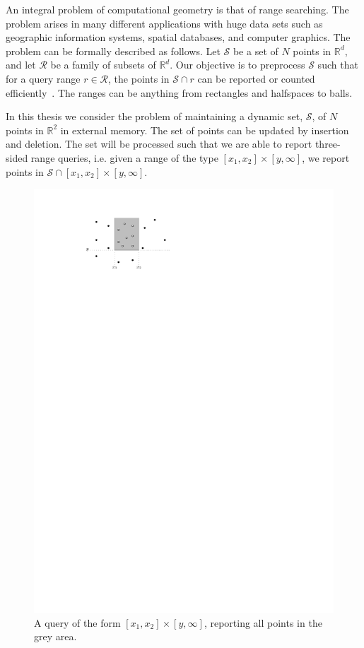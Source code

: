 \documentclass[twoside,11pt,openright]{report}
\begin{document}
An integral problem of computational geometry is that of range searching. The problem arises in many different applications with huge data sets such as geographic information systems, spatial databases, and computer graphics. The problem can be formally described as follows. Let $\mathcal{S}$ be a set of $N$ points in $\mathbb{R}^d$, and let $\mathcal{R}$ be a family of subsets of $\mathbb{R}^d$. Our objective is to preprocess $\mathcal{S}$ such that for a query range $r \in \mathcal{R}$, the points in $\mathcal{S} \cap r$ can be reported or counted efficiently~\cite{Agarwal99geometricrange}. The ranges can be anything from rectangles and halfspaces to balls.

In this thesis we consider the problem of maintaining a dynamic set, $\mathcal{S}$, of $N$ points in $\mathbb{R}^2$ in external memory. The set of points can be updated by insertion and deletion. The set will be processed such that we are able to report three-sided range queries, i.e. given a range of the type $[x_1,x_2] \times [y,\infty]$, we report points in $\mathcal{S} \cap [x_1,x_2] \times [y,\infty]$.

\begin{figure}[h]
	\centering
	\includegraphics[scale=1]{../figures/three-sided-query}
	\caption{A query of the form $[x_1,x_2] \times [y,\infty]$, reporting all points in the grey area.}
	\label{fig:three-sided-query}
\end{figure}
 
\end{document}
